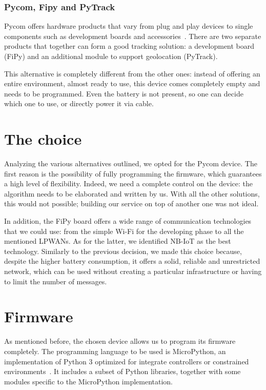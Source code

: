 \subsubsection{Pycom, Fipy and PyTrack}
Pycom offers hardware products that vary from plug and play devices to single components such as development boards and accessories~\cite{pycom}. There are two separate products that together can form a good tracking solution: a development board (FiPy) and an additional module to support geolocation (PyTrack).

This alternative is completely different from the other ones: instead of offering an entire environment, almost ready to use, this device comes completely empty and needs to be programmed. Even the battery is not present, so one can decide which one to use, or directly power it via cable. 

\section{The choice}
\label{sec:track_choice}

Analyzing the various alternatives outlined, we opted for the Pycom device. The first reason is the possibility of fully programming the firmware, which guarantees a high level of flexibility. Indeed, we need a complete control on the device: the algorithm needs to be elaborated and written by us. With all the other solutions, this would not possible; building our service on top of another one was not ideal.

In addition, the FiPy board offers a wide range of communication technologies that we could use: from the simple Wi-Fi for the developing phase to all the mentioned LPWANs. As for the latter, we identified NB-IoT as the best technology. Similarly to the previous decision, we made this choice because, despite the higher battery consumption, it offers a solid, reliable and unrestricted network, which can be used without creating a particular infrastructure or having to limit the number of messages.

\section{Firmware}
\label{sec:track_firmware}
As mentioned before, the chosen device allows us to program its firmware completely. The programming language to be used is MicroPython, an implementation of Python 3 optimized for integrate controllers or constrained environments~\cite{micropy}. It includes a subset of Python libraries, together with some modules specific to the MicroPython implementation.

